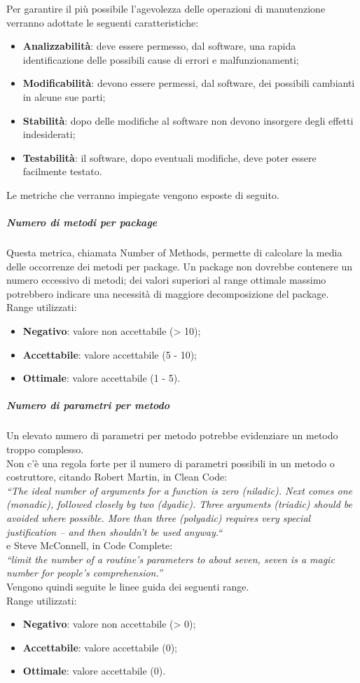 \documentclass[../PianoDiQualifica.tex]{subfiles}
\begin{document}
			Per garantire il più possibile l'agevolezza delle operazioni di manutenzione verranno adottate le seguenti caratteristiche:
			\begin{itemize}
				\item \textbf{Analizzabilità}: deve essere permesso, dal software, una rapida identificazione delle possibili cause di errori e malfunzionamenti;
				\item \textbf{Modificabilità}: devono essere permessi, dal software, dei possibili cambianti in alcune sue parti;
				\item \textbf{Stabilità}: dopo delle modifiche al software non devono insorgere degli effetti indesiderati;
				\item \textbf{Testabilità}: il software, dopo eventuali modifiche, deve poter essere facilmente testato.
			\end{itemize}
			Le metriche che verranno impiegate vengono esposte di seguito.

			\subparagraph{Numero di metodi per package}
			Questa metrica, chiamata Number of Methods, permette di calcolare la media delle occorrenze dei metodi per package. Un package non dovrebbe contenere un numero eccessivo di metodi; dei valori superiori al range ottimale massimo potrebbero indicare una necessità di maggiore decomposizione del package.\\
				Range utilizzati:
				\begin{itemize}
					\item \textbf{Negativo}: valore non accettabile (> 10);
					\item \textbf{Accettabile}: valore accettabile (5 - 10);
					\item \textbf{Ottimale}: valore accettabile (1 - 5).
				\end{itemize}

			\subparagraph{Numero di parametri per metodo}
			Un elevato numero di parametri per metodo potrebbe evidenziare un metodo troppo complesso.\\
			Non c'è una regola forte per il numero di parametri possibili in un metodo o costruttore, citando Robert Martin, in Clean Code:\\
\textit{“The ideal number of arguments for a function is zero (niladic). Next comes one (monadic), followed closely by two (dyadic). Three arguments (triadic) should be avoided where possible. More than three (polyadic) requires very special justification – and then shouldn’t be used anyway.“}\\
e Steve McConnell, in Code Complete:\\
\textit{“limit the number of a routine’s parameters to about seven, seven is a magic number for people’s comprehension.”}\\
Vengono quindi seguite le linee guida dei seguenti range.\\
				Range utilizzati:
				\begin{itemize}
					\item \textbf{Negativo}: valore non accettabile (> 0);
					\item \textbf{Accettabile}: valore accettabile (0);
					\item \textbf{Ottimale}: valore accettabile (0).
				\end{itemize}
\end{document}
